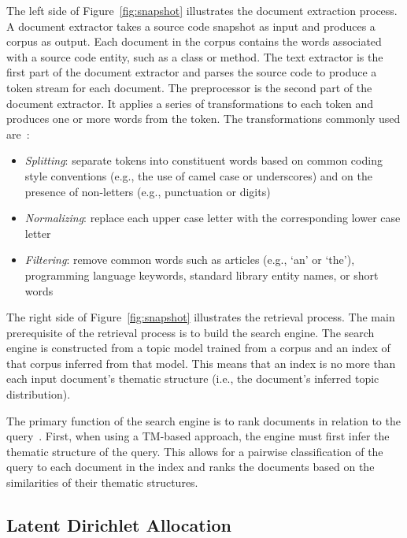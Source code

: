 The left side of Figure~\ref{fig:snapshot} illustrates the document extraction
process.  A document extractor takes a source code snapshot as input and produces a corpus
as output.  Each document in the corpus contains the words associated with
a source code entity, such as a class or method.  The text extractor is the first
part of the document extractor and parses the source code to produce a token
stream for each document.  The preprocessor is the second part of the document
extractor.  It applies a series of transformations to each token and produces
one or more words from the token.
The transformations commonly used are~\cite{Marcus-etal:2004,Marcus-Menzies:2010}: %
\begin{itemize}
    \item {\it Splitting}: separate tokens into constituent words based on
        common coding style conventions (e.g., the use of camel case or
        underscores) and on the presence of non-letters (e.g., punctuation or
        digits)
    \item {\it Normalizing}: replace each upper case letter with the
        corresponding lower case letter
    \item {\it Filtering}: remove common words such as articles (e.g., `an' or
        `the'), programming language keywords, standard library entity names, or
        short words
\end{itemize}

The right side of Figure~\ref{fig:snapshot} illustrates the retrieval process.
The main prerequisite of the retrieval process is to build the search engine.
The search engine is constructed from a topic model trained from a corpus and an
index of that corpus inferred from that model.
This means that an index is no more than each input document's thematic
structure (i.e., the document's inferred topic distribution).

The primary function of the search engine is to rank documents in relation to
the query~\cite{Croft-etal:2010}.  First, when using a TM-based approach, the
engine must first infer the thematic structure of the query.  This allows for
a pairwise classification of the query to each document in the index and ranks
the documents based on the similarities of their thematic structures.

\subsection{Latent Dirichlet Allocation}

